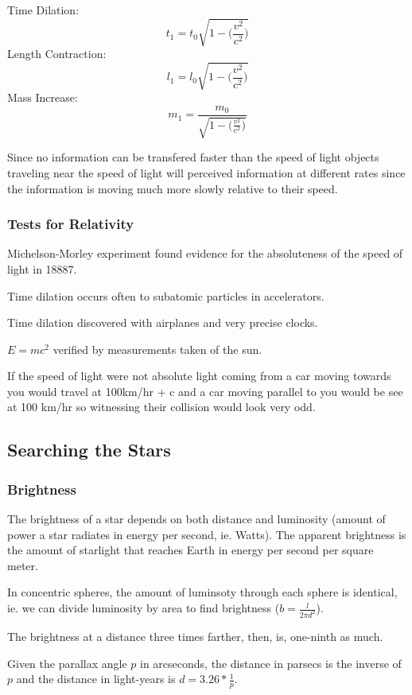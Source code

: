\documentclass[12pt]{article}
\begin{document}
Time Dilation: \[ t_1 = t_0\sqrt{1-\bigg(\frac{v^2}{c^2}\bigg)} \]
Length Contraction: \[ l_1 = l_0\sqrt{1-\bigg(\frac{v^2}{c^2}\bigg)} \]
Mass Increase: \[ m_1 = \frac{m_0}{\sqrt{1-\bigg(\frac{v^2}{c^2}\bigg)}} \]

Since no information can be transfered faster than the speed of light objects traveling near the speed of light will perceived information at different rates since the information is moving much more slowly relative to their speed.

\subsubsection{Tests for Relativity}
Michelson-Morley experiment found evidence for the absoluteness of the speed of light in 18887.

Time dilation occurs often to subatomic particles in accelerators.

Time dilation discovered with airplanes and very precise clocks.

$E = mc^2$ verified by measurements taken of the sun.

If the speed of light were not absolute light coming from a car moving towards you would travel at 100km/hr + c and a car moving parallel to you would be see at 100 km/hr so witnessing their collision would look very odd.

\subsection{Searching the Stars}
\subsubsection{Brightness}
The brightness of a star depends on both distance and luminosity (amount of power a star radiates in energy per second, ie. Watts). The apparent brightness is the amount of starlight that reaches Earth in energy per second per square meter.

In concentric spheres, the amount of luminsoty through each sphere is identical, ie. we can divide luminosity by area to find brightness ($b = \frac{l}{2\pi d^2}$).

The brightness at a distance three times farther, then, is, one-ninth as much.

Given the parallax angle $p$ in arcseconds, the distance in parsecs is the inverse of $p$ and the distance in light-years is $d = 3.26 * \frac{1}{p}$.
\end{document}
